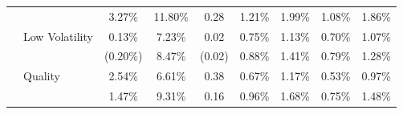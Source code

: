 \documentclass[12pt]{article}
\begin{document}
\begin{table}[H]
{\begin{tabular}{@{}llccccccc@{}}
                              &                                                        & {\color[HTML]{303498} 3.27\%}                               & {\color[HTML]{303498} 11.80\%}                                  & {\color[HTML]{303498} 0.28}                            & {\color[HTML]{303498} 1.21\%}                                 & {\color[HTML]{303498} 1.99\%}                                & {\color[HTML]{303498} 1.08\%}                                 & {\color[HTML]{303498} 1.86\%}                               \\
                              & Low Volatility                                         & 0.13\%                                                      & 7.23\%                                                          & 0.02                                                   & 0.75\%                                                        & 1.13\%                                                       & 0.70\%                                                        & 1.07\%                                                      \\
                              &                                                        & {\color[HTML]{303498} (0.20\%)}                             & {\color[HTML]{303498} 8.47\%}                                   & {\color[HTML]{303498} (0.02)}                          & {\color[HTML]{303498} 0.88\%}                                 & {\color[HTML]{303498} 1.41\%}                                & {\color[HTML]{303498} 0.79\%}                                 & {\color[HTML]{303498} 1.28\%}                               \\
                              & Quality                                                & 2.54\%                                                      & 6.61\%                                                          & 0.38                                                   & 0.67\%                                                        & 1.17\%                                                       & 0.53\%                                                        & 0.97\%                                                      \\
                              &                                                        & {\color[HTML]{303498} 1.47\%}                               & {\color[HTML]{303498} 9.31\%}                                   & {\color[HTML]{303498} 0.16}                            & {\color[HTML]{303498} 0.96\%}                                 & {\color[HTML]{303498} 1.68\%}                                & {\color[HTML]{303498} 0.75\%}                                 & {\color[HTML]{303498} 1.48\%}                               \\ \midrule

\end{tabular}}
\end{table}
\end{document}
